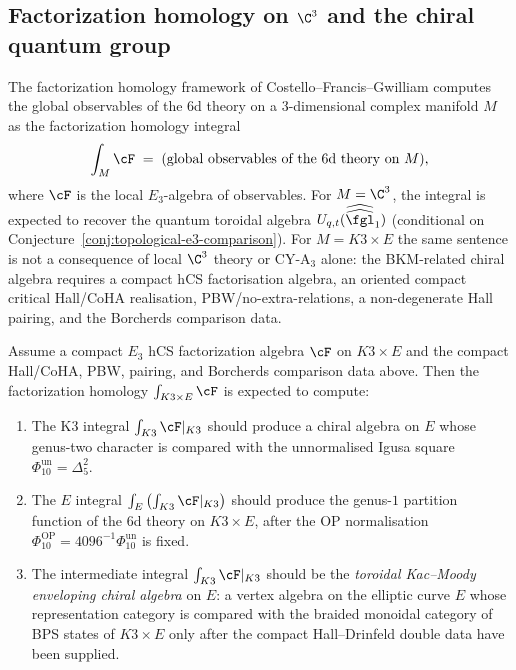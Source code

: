 \subsection{Factorization homology on \texorpdfstring{$\C^3$}{C-3} and the chiral quantum group}
\label{subsec:fact-hom-c3}
\label{subsec:qg-from-fh}

The factorization homology framework of Costello--Francis--Gwilliam computes the global observables of the 6d theory on a $3$-dimensional complex manifold $M$ as the factorization homology integral
\[
 \int_M \cF \;=\; \text{(global observables of the 6d theory on $M$)},
\]
where $\cF$ is the local $E_3$-algebra of observables. For $M = \C^3$, the integral is expected to recover the quantum toroidal algebra $U_{q,t}(\widehat{\widehat{\fgl}}_1)$ (conditional on Conjecture~\ref{conj:topological-e3-comparison}). For $M = K3 \times E$ the same sentence is not a consequence of local $\C^3$ theory or CY-A$_3$ alone: the BKM-related chiral algebra requires a compact hCS factorisation algebra, an oriented compact critical Hall/CoHA realisation, PBW/no-extra-relations, a non-degenerate Hall pairing, and the Borcherds comparison data.

\begin{conjecture}
\label{conj:fact-hom-k3xe}
\ClaimStatusConjectured
Assume a compact $E_3$ hCS factorization algebra $\cF$ on $K3 \times E$ and the compact Hall/CoHA, PBW, pairing, and Borcherds comparison data above. Then the factorization homology $\int_{K3 \times E} \cF$ is expected to compute:
\begin{enumerate}[label=\textup{(\roman*)}]
 \item The K3 integral $\int_{K3} \cF|_{K3}$ should produce a chiral algebra on $E$ whose genus-two character is compared with the unnormalised Igusa square $\Phi_{10}^{\mathrm{un}}=\Delta_5^2$.
 \item The $E$ integral $\int_E \left(\int_{K3} \cF|_{K3}\right)$ should produce the genus-$1$ partition function of the 6d theory on $K3 \times E$, after the OP normalisation $\Phi_{10}^{\mathrm{OP}}=4096^{-1}\Phi_{10}^{\mathrm{un}}$ is fixed.
 \item The intermediate integral $\int_{K3} \cF|_{K3}$ should be the \emph{toroidal Kac--Moody enveloping chiral algebra} on $E$: a vertex algebra on the elliptic curve $E$ whose representation category is compared with the braided monoidal category of BPS states of $K3 \times E$ only after the compact Hall--Drinfeld double data have been supplied.
\end{enumerate}
\end{conjecture}


